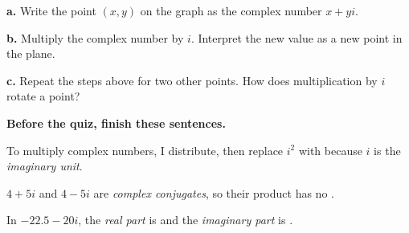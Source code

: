 \begin{minipage}[t]{0.40\textwidth}
\vspace{0pt}
\end{minipage}\hfill
\begin{minipage}[t]{0.57\textwidth}
\vspace{0pt}
\textbf{a.} Write the point $(x,y)$ on the graph as the complex number $x+yi$.\par \blank[4cm]

\vspace{4pt}
\textbf{b.} Multiply the complex number by $i$. Interpret the new value as a new point in the plane.
\lines[2]

\vspace{4pt}
\textbf{c.} Repeat the steps above for two other points. How does multiplication by $i$ rotate a point?
\lines[3]
\end{minipage}

\vspace{6pt}
\textbf{Before the quiz, finish these sentences.}

To multiply complex numbers, I distribute, then replace $i^2$ with \blank[2cm] because $i$ is the \emph{imaginary unit}.

$4+5i$ and $4-5i$ are \emph{complex conjugates}, so their product has no \blank[3.5cm].

In $-22.5-20i$, the \emph{real part} is \blank[2.5cm] and the \emph{imaginary part} is \blank[2.5cm].


